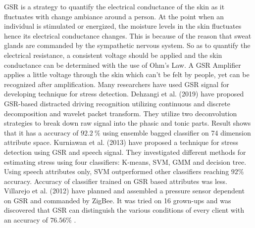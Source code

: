 GSR is a strategy to quantify the electrical conductance of the skin as it fluctuates with change ambiance around a person. At the point when an individual is stimulated or energized, the moisture levels in the skin fluctuates hence its electrical conductance changes. This is because of the reason that sweat glands are commanded by the sympathetic nervous system. So as to quantify the electrical resistance, a consistent voltage should be applied and the skin conductance can be determined with the use of Ohm’s Law. A GSR Amplifier applies a little voltage through the skin which can’t be felt by people, yet can be recognized after amplification. Many researchers have used GSR signal for developing technique for stress detection. Dehzangi et al. (2019) have proposed GSR-based distracted driving recognition utilizing continuous and discrete decomposition and wavelet packet transform. They utilize two deconvolution strategies to break down raw signal into the phasic and tonic parts. Result shows that it has a accuracy of $92.2~\%$ using ensemble bagged classifier on 74 dimension attribute space. Kurniawan et al. (2013) have proposed a technique for stress detection using GSR and speech signal. They investigated different methods for estimating stress using four classifiers: K-means, SVM, GMM and decision tree. Using speech attributes only, SVM outperformed other classifiers reaching $92\%$ accuracy. Accuracy of classifier trained on GSR based attributes was less. Villarejo et al. (2012) have planned and assembled a pressure sensor dependent on GSR and commanded by ZigBee. It was tried on 16 grown-ups and was discovered that GSR can distinguish the various conditions of every client with an accuracy of $76.56\%$ .

